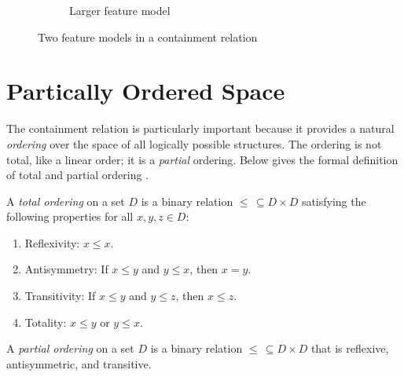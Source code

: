 \begin{figure}[ht]
\begin{subfigure}[b]{0.45\textwidth}
        \caption{Larger feature model}
        \label{fig:feature-factor-big}
    \end{subfigure}

    \caption{Two feature models in a containment relation}
    \label{fig:feature-factors}
\end{figure}


\section{Partically Ordered Space}
\label{sec:poset}
The containment relation is particularly important because it provides
a natural \textit{ordering} over the space of all logically possible 
structures. The ordering is not total, like a linear order; it is a 
\textit{partial} ordering. Below gives the formal definition of total and partial ordering \citep{CLRS2022}.

\begin{definition}
A \emph{total ordering} on a set $D$ is a binary relation
$\leq \,\subseteq D \times D$ satisfying the following properties
for all $x,y,z \in D$:
\begin{enumerate}[itemsep=1em, parsep=-1em]
    \item Reflexivity: $x \leq x$.
    \item Antisymmetry: If $x \leq y$ and $y \leq x$,
    then $x = y$.
    \item Transitivity: If $x \leq y$ and $y \leq z$,
    then $x \leq z$.
    \item Totality: $x \leq y$ or $y \leq x$.
\end{enumerate}
\end{definition}

\begin{definition}
A \emph{partial ordering} on a set $D$ is a binary relation
$\leq \,\subseteq D \times D$ that is reflexive, antisymmetric,
and transitive. 
\end{definition}


